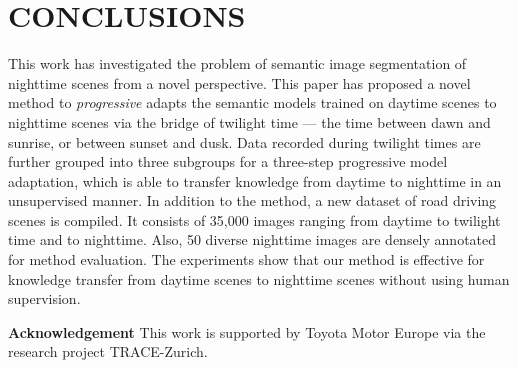 \documentclass[letterpaper, 10 pt, conference]{ieeeconf}
\begin{document}
\section{CONCLUSIONS}
\label{sec:conclusion}
This work has investigated the problem of semantic image segmentation of nighttime scenes from a novel perspective.  This paper has proposed a novel method to \emph{progressive} adapts the semantic models trained on daytime scenes to nighttime scenes via the bridge of twilight time --- the time between dawn and sunrise, or between sunset and dusk. Data recorded during twilight times are further grouped into three subgroups for a three-step progressive model adaptation, which is able to transfer knowledge from daytime to nighttime in an unsupervised manner.  In addition to the method, a new dataset of road driving scenes is compiled. It consists of 35,000 images ranging from daytime to twilight time and to nighttime. Also, 50 diverse nighttime images are densely annotated for method evaluation. The experiments show that our method is effective for knowledge transfer from daytime scenes to nighttime scenes without using human supervision. 


\vspace{1mm}
\noindent
\textbf{Acknowledgement} This work is supported by Toyota Motor Europe via the research project TRACE-Zurich. 













\end{document}
